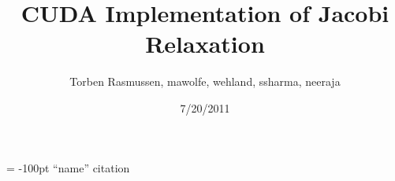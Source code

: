 \documentclass[12pt]{report}
\title{CUDA Implementation of Jacobi Relaxation}
\author{Torben Rasmussen, mawolfe, wehland, ssharma, neeraja}
\date{7/20/2011}
\begin{document}
\maketitle



\begin{flushleft}
\begin{thebibliography}{99}
\topmargin = -100pt
    ``name''
        citation
\end{thebibliography}
\end{flushleft}
\end{document}

